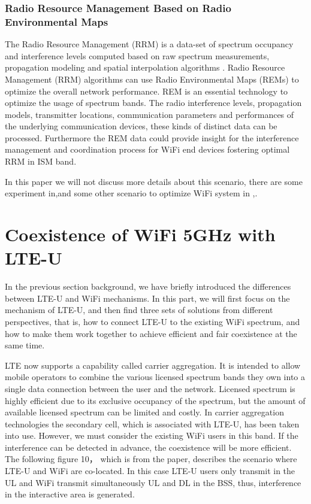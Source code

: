 \documentclass{IEEEtran}
\begin{document}
\subsubsection{Radio Resource Management Based on Radio Environmental Maps}
The Radio Resource Management (RRM) is a data-set of spectrum occupancy and interference levels computed based on raw spectrum measurements, propagation modeling and spatial interpolation algorithms \cite{Rakovic2016}. Radio Resource Management (RRM) algorithms can use Radio Environmental Maps (REMs) to optimize the overall network performance. REM is an essential technology to optimize the usage of spectrum bands. The radio interference levels, propagation models, transmitter locations, communication parameters and performances of the underlying communication devices, these kinds of distinct data can be processed. Furthermore the REM data could provide insight for the interference management and coordination process for WiFi end devices fostering optimal RRM in ISM band.

In this paper we will not discuss more details about this scenario, there are some experiment in\cite{Dion2017},and some other scenario to optimize WiFi system in \cite{Tinnirello2011},\cite{Molina2017}.


\section{Coexistence of WiFi 5GHz with LTE-U}
In the previous section background, we have briefly introduced the differences between LTE-U and WiFi mechanisms. In this part, we will first focus on the mechanism of LTE-U, and then find three sets of solutions from different perspectives, that is, how to connect LTE-U to the existing WiFi spectrum, and how to make them work together to achieve efficient and fair coexistence at the same time.

LTE now supports a capability called carrier aggregation. It is intended to allow mobile operators to combine the various licensed spectrum bands they own into a single data connection between the user and the network. Licensed spectrum is highly efficient due to its exclusive occupancy of the spectrum, but the amount of available licensed spectrum can be limited and costly. In carrier aggregation technologies the secondary cell, which is associated with LTE-U, has been taken into use. However, we must consider the existing WiFi users in this band. If the interference can be detected in advance, the coexistence will be more efficient. The following figure 10， which is from the paper\cite{Olbrich2017}, describes the scenario where LTE-U and WiFi are co-located. In this case LTE-U users only transmit in the UL and WiFi transmit simultaneously UL and DL in the BSS, thus, interference in the interactive area is generated.
\end{document}
